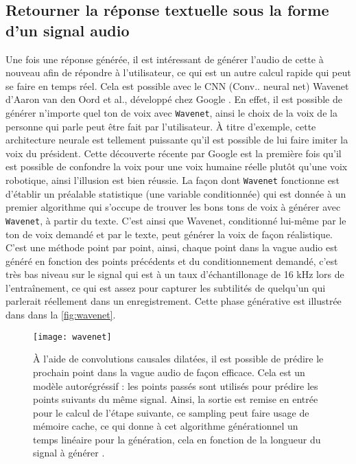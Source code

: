 \subsection{Retourner la réponse textuelle sous la forme d'un signal audio}
Une fois une réponse générée, il est intéressant de générer l’audio de cette à nouveau afin de répondre à l’utilisateur, ce qui est un autre calcul rapide qui peut se faire en temps réel. Cela est possible avec le CNN (Conv.. neural net) Wavenet d’Aaron van den Oord et al., développé chez Google \cite{wavenet}. En effet, il est possible de générer n’importe quel ton de voix avec \texttt{Wavenet}, ainsi le choix de la voix de la personne qui parle peut être fait par l’utilisateur. À titre d’exemple, cette architecture neurale est tellement puissante qu’il est possible de lui faire imiter la voix du président. Cette découverte récente par Google est la première fois qu’il est possible de confondre la voix pour une voix humaine réelle plutôt qu’une voix robotique, ainsi l’illusion est bien réussie. La façon dont \texttt{Wavenet} fonctionne est d’établir un préalable statistique (une variable conditionnée) qui est donnée à un premier algorithme qui s’occupe de trouver les bons tons de voix à générer avec \texttt{Wavenet}, à partir du texte. C’est ainsi que Wavenet, conditionné lui-même par le ton de voix demandé et par le texte, peut générer la voix de façon réalistique. C’est une méthode point par point, ainsi, chaque point dans la vague audio est généré en fonction des points précédents et du conditionnement demandé, c’est très bas niveau sur le signal qui est à un taux d’échantillonage de 16 kHz lors de l’entraînement, ce qui est assez pour capturer les subtilités de quelqu’un qui parlerait réellement dans un enregistrement. Cette phase générative est illustrée dans dans la \autoref{fig:wavenet}.

\begin{figure*}
  \centering
  \texttt{[image: wavenet]}
  \caption{À l’aide de convolutions causales dilatées, il est possible de prédire le prochain point dans la vague audio de façon efficace. Cela est un modèle autorégréssif : les points passés sont utilisés pour prédire les points suivants du même signal. Ainsi, la sortie est remise en entrée pour le calcul de l’étape suivante, ce sampling peut faire usage de mémoire cache, ce qui donne à cet algorithme générationnel un temps linéaire pour la génération, cela en fonction de la longueur du signal à générer \cite{wavenet}.}
  \label{fig:wavenet}
\end{figure*}
